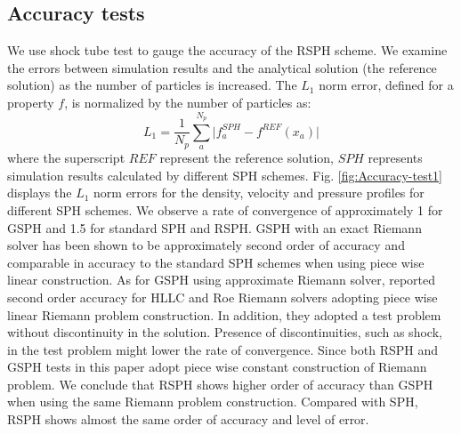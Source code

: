 \documentclass[review]{elsarticle}
\begin{document}
\subsection{Accuracy tests}
We use shock tube test to gauge the accuracy of the RSPH scheme.
We examine the errors between simulation results and the analytical solution (the reference solution) as the number of particles is increased. The $L_1$ norm error, defined for a property $f$, is normalized by the number of particles as:
\begin{equation}
L_1= \frac{1}{N_p} \sum_a^{N_p} \vert f_a^{SPH} - f^{REF} (x_a) \vert 
\end{equation}
where the superscript $REF$ represent the reference solution, $SPH$ represents simulation results calculated by different SPH schemes. Fig. \ref{fig:Accuracy-test1} displays the $L_1$ norm errors for the density, velocity and pressure profiles for different SPH schemes.
We observe a rate of convergence of approximately 1 for GSPH and 1.5 for standard SPH and RSPH.
GSPH with an exact Riemann solver has been shown to be approximately second order of accuracy \citep{puri2014comparison} and comparable in accuracy to the standard SPH schemes when using piece wise linear construction. As for GSPH using approximate Riemann solver, \citet{puri2014approximate} reported second order accuracy for HLLC and Roe Riemann solvers adopting piece wise linear Riemann problem construction. In addition, they adopted a test problem without discontinuity in the solution. Presence of discontinuities, such as shock, in the test problem might lower the rate of convergence. Since both RSPH and GSPH tests in this paper adopt piece wise constant construction of Riemann problem. We conclude that RSPH shows higher order of accuracy than GSPH when using the same Riemann problem construction. Compared with SPH, RSPH shows almost the same order of accuracy and level of error.  
\end{document}
